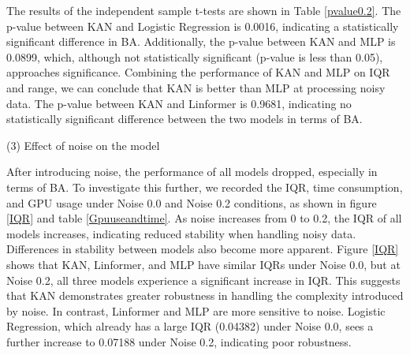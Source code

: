 \documentclass{article}
\begin{document}
The results of the independent sample t-tests are shown in Table \ref{pvalue0.2}. The p-value between KAN and Logistic Regression is 0.0016, indicating a statistically significant difference in BA. Additionally, the p-value between KAN and MLP is 0.0899, which, although not statistically significant (p-value is less than 0.05), approaches significance. Combining the performance of KAN and MLP on IQR and range, we can conclude that KAN is better than MLP at processing noisy data. The p-value between KAN and Linformer is 0.9681, indicating no statistically significant difference between the two models in terms of BA.

 

\begin{table}[htbp]
\centering
\caption{Time Taken and GPU Usage under Different Noise Conditions}
\label{Gpuuseandtime}
\end{table}






(3) Effect of noise on the model

After introducing noise, the performance of all models dropped, especially in terms of BA. To investigate this further, we recorded the IQR, time consumption, and GPU usage under Noise 0.0 and Noise 0.2 conditions, as shown in figure \ref{IQR} and table \ref{Gpuuseandtime}. As noise increases from 0 to 0.2, the IQR of all models increases, indicating reduced stability when handling noisy data. Differences in stability between models also become more apparent. Figure \ref{IQR} shows that KAN, Linformer, and MLP have similar IQRs under Noise 0.0, but at Noise 0.2, all three models experience a significant increase in IQR. This suggests that KAN demonstrates greater robustness in handling the complexity introduced by noise. In contrast, Linformer and MLP are more sensitive to noise. Logistic Regression, which already has a large IQR (0.04382) under Noise 0.0, sees a further increase to 0.07188 under Noise 0.2, indicating poor robustness.
\end{document}
